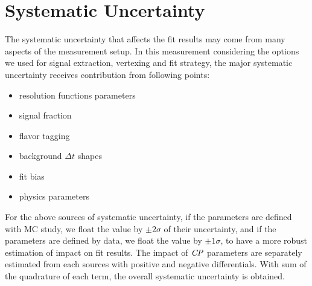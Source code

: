 \section{Systematic Uncertainty}
The systematic uncertainty that affects the fit results may come from many aspects of the measurement setup. 
In this measurement considering the options we used for signal extraction, vertexing and fit strategy, the major systematic uncertainty receives contribution from following points:

\begin{itemize}
	\item resolution functions parameters
	\item signal fraction
	\item flavor tagging 
	\item background $\Delta t$ shapes
	\item fit bias
	\item physics parameters
\end{itemize}
For the above sources of systematic uncertainty, if the parameters are defined with MC study, we float the value by $\pm 2 \sigma$ of their uncertainty, and if the parameters are defined by data, we float the value by $\pm 1 \sigma$, to have a more robust estimation of impact on fit results. The impact of $\it{CP}$ parameters are separately estimated from each sources with positive and negative differentials. With sum of the quadrature of each term, the overall systematic uncertainty is obtained. 

